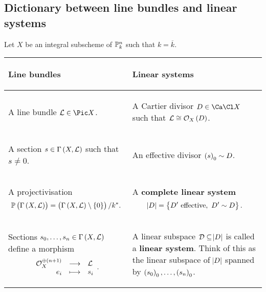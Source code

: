 \pagebreak

\subsection{Dictionary between line bundles and linear systems}

Let $ X $ be an integral subscheme of $ \mathbb{P}_k^n $ such that $ k = \overline{k} $.
\begin{center}
\begin{tabular}{p{}|p{}}
\begin{center} Line bundles \end{center} & \begin{center} Linear systems \end{center} \\
\hline
\begin{center} A line bundle $ \LLL \in \Pic X $. \end{center} & \begin{center} A Cartier divisor $ D \in \Ca\Cl X $ such that $ \LLL \cong \OOO_X\br{D} $. \end{center} \\
\begin{center} A section $ s \in \Gamma\br{X, \LLL} $ such that $ s \ne 0 $. \end{center} & \begin{center} An effective divisor $ \br{s}_0 \sim D $. \end{center} \\
\begin{center} A projectivisation $$ \PP\br{\Gamma\br{X, \LLL}} = \br{\Gamma\br{X, \LLL} \setminus \cbr{0}} / k^*. $$ \end{center} & \begin{center} A \textbf{complete linear system} $$ \abs{D} = \cbr{D' \ \text{effective}, \ D' \sim D}. $$ \end{center} \\
\begin{center} Sections $ s_0, \dots, s_n \in \Gamma\br{X, \LLL} $ define a morphism $$ \begin{array}{rcl} \OOO_X^{\oplus \br{n + 1}} & \longrightarrow & \LLL \\ e_i & \longmapsto & s_i \end{array}. $$ \end{center} & \begin{center} A linear subspace $ \mathcal{D} \subseteq \abs{D} $ is called a \textbf{linear system}. Think of this as the linear subspace of $ \abs{D} $ spanned by $ \br{s_0}_0, \dots, \br{s_n}_0 $. \end{center} \\

\end{tabular}
\end{center}
